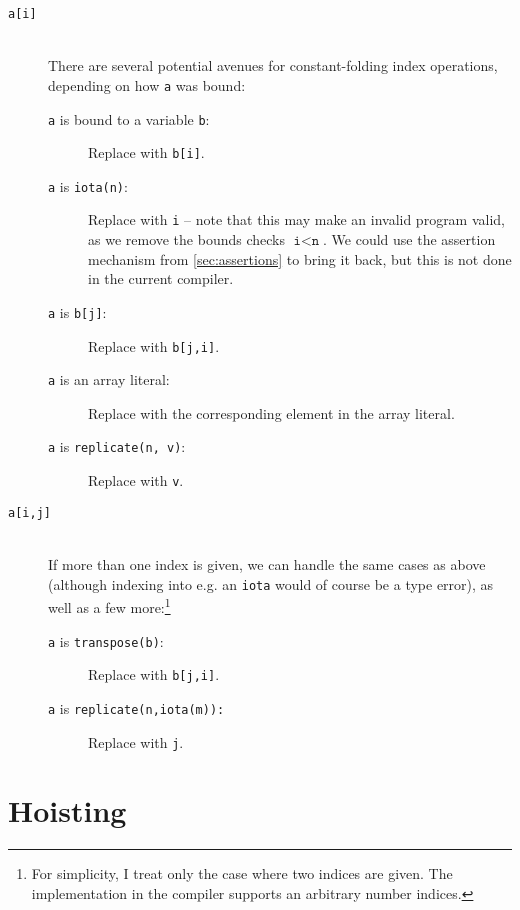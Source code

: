 \begin{description}
  \item[\texttt{a[i]}]\hfill\\
    There are several potential avenues for constant-folding index
    operations, depending on how \texttt{a} was bound:
    \begin{description}
    \item[\texttt{a} is bound to a variable \texttt{b}:] Replace with \texttt{b[i]}.

    \item[\texttt{a} is \texttt{iota(n)}:] Replace with \texttt{i} --
      note that this may make an invalid program valid, as we remove
      the bounds checks $\texttt{i}<\texttt{n}$.  We could use the
      assertion mechanism from \cref{sec:assertions} to bring it back,
      but this is not done in the current compiler.

    \item[\texttt{a} is \texttt{b[j]}:] Replace with \texttt{b[j,i]}.

    \item[\texttt{a} is an array literal:] Replace with the
      corresponding element in the array literal.

    \item[\texttt{a} is \texttt{replicate(n, v)}:] Replace with
      \texttt{v}.
    \end{description}

  \item[\texttt{a[i,j]}]\hfill\\
    If more than one index is given, we can handle the same cases as
    above (although indexing into e.g. an \texttt{iota} would of
    course be a type error), as well as a few more:\footnote{For
      simplicity, I treat only the case where two indices are given.
      The implementation in the \LO{} compiler supports an arbitrary
      number indices.}
    \begin{description}
    \item[\texttt{a} is \texttt{transpose(b)}:] Replace with
      \texttt{b[j,i]}.
    \item[\texttt{a} is \texttt{replicate(n,iota(m)):}] Replace with
      \texttt{j}.
    \end{description}
\end{description}

\section{Hoisting}

